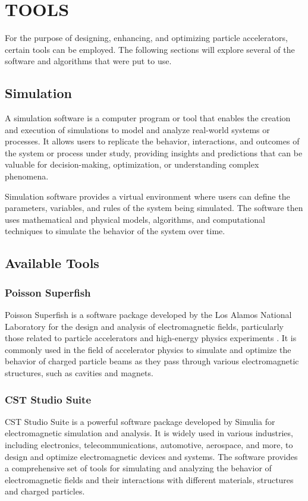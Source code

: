 \documentclass[a4paper,oneside,12pt]{report}
\numberwithin{equation}{chapter}
\begin{document}
\newpage


\chapter{TOOLS}

For the purpose of designing, enhancing, and optimizing particle accelerators, certain tools can be employed. 
The following sections will explore several of the software and algorithms that were put to use.

\section{Simulation}
A simulation software is a computer program or tool that enables the creation and execution of 
simulations to model and analyze real-world systems or processes. 
It allows users to replicate the behavior, interactions, and outcomes of the system or process under study, 
providing insights and predictions that can be valuable for decision-making, optimization, or understanding complex phenomena.

Simulation software provides a virtual environment where users can define the parameters,
variables, and rules of the system being simulated. The software then uses mathematical and physical models, 
algorithms, and computational techniques to simulate the behavior of the system over time.



\section{Available Tools}

\subsection{Poisson Superfish}
Poisson Superfish is a software package developed by the Los Alamos National Laboratory 
for the design and analysis of electromagnetic fields, particularly those related to particle accelerators and high-energy physics experiments \cite{poi-sup}.
It is commonly used in the field of accelerator physics to simulate and optimize the behavior of charged particle beams as they pass through various electromagnetic structures, such as cavities and magnets.


\subsection{CST Studio Suite}
CST Studio Suite is a powerful software package developed by Simulia for electromagnetic simulation and analysis. It is widely used in various industries, including electronics, telecommunications, automotive, aerospace, and more, to design and optimize electromagnetic devices and systems. 
The software provides a comprehensive set of tools for simulating and analyzing the behavior of electromagnetic fields and their interactions with different materials, structures and charged particles.
\end{document}
